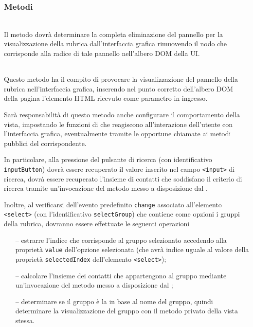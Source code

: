 \subsubsection*{Metodi}
\begin{description}

\item{}\\
Il metodo dovrà determinare la completa eliminazione del pannello per la visualizzazione della rubrica dall'interfaccia grafica rimuovendo il nodo che corrisponde alla radice di tale pannello nell'albero DOM della UI\@.

\item{}\\
Questo metodo ha il compito di provocare la visualizzazione del pannello della rubrica nell'interfaccia grafica, inserendo nel punto corretto dell'albero DOM della pagina l'elemento HTML ricevuto come parametro in ingresso.

Sarà responsabilità di questo metodo anche configurare il comportamento della vista, impostando le funzioni di  che reagiscono all'interazione dell'utente con l'interfaccia grafica, eventualmente tramite le opportune chiamate ai metodi pubblici del  corrispondente.

In particolare, alla pressione del pulsante di ricerca (con identificativo \verb'inputButton') dovrà essere recuperato il valore inserito nel campo \verb'<input>' di ricerca, dovrà essere recuperato l'insieme di contatti che soddisfano il criterio di ricerca tramite un'invocazione del metodo  messo a disposizione dal .

Inoltre, al verificarsi dell'evento predefinito \verb'change' associato all'elemento  \verb'<select>' (con l'identificativo \verb'selectGroup') che contiene come opzioni i gruppi della rubrica, dovranno essere effettuate le seguenti operazioni
\begin{itemize}
  \item[--] estrarre l'indice che corrisponde al gruppo selezionato accedendo alla proprietà \verb'value' dell'opzione selezionata (che avrà indice uguale al valore della proprietà \verb'selectedIndex' dell'elemento \verb'<select>');
  \item[--] calcolare l'insieme dei contatti che appartengono al gruppo mediante un'invocazione del metodo  messo a disposizione dal ;
  \item[--] determinare se il gruppo è la  in base al nome del gruppo, quindi determinare la visualizzazione del gruppo con il metodo privato  della vista stessa.
\end{itemize}


\end{description}
